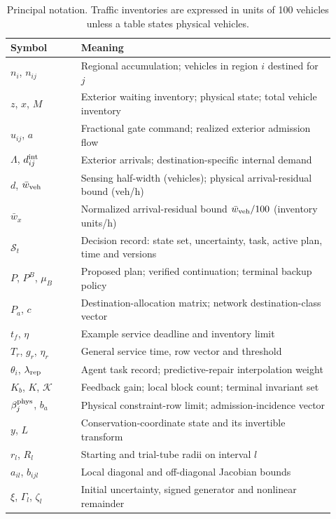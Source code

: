 \documentclass[preprint,12pt]{elsarticle}
\begin{document}
\begin{table}[!tp]
\centering\small
\caption{Principal notation. Traffic inventories are expressed in units of
100 vehicles unless a table states physical vehicles.}
\label{tab:nomenclature}
\renewcommand{\arraystretch}{0.98}
\begin{tabular}{@{}p{0.20\linewidth}p{0.72\linewidth}@{}}
\toprule
Symbol & Meaning\\
\midrule
$n_i$, $n_{ij}$ & Regional accumulation; vehicles in region $i$ destined for $j$\\
$z$, $x$, $M$ & Exterior waiting inventory; physical state; total vehicle inventory\\
$u_{ij}$, $a$ & Fractional gate command; realized exterior admission flow\\
$\Lambda$, $d^{\rm int}_{ij}$ & Exterior arrivals; destination-specific internal demand\\
$d$, $\bar w_{\rm veh}$ & Sensing half-width (vehicles); physical arrival-residual bound (veh/h)\\
$\bar w_x$ & Normalized arrival-residual bound $\bar w_{\rm veh}/100$ (inventory units/h)\\
$\mathcal S_t$ & Decision record: state set, uncertainty, task, active plan, time and versions\\
$P$, $P^B$, $\mu_B$ & Proposed plan; verified continuation; terminal backup policy\\
$P_a$, $c$ & Destination-allocation matrix; network destination-class vector\\
$t_f$, $\eta$ & Example service deadline and inventory limit\\
$T_r$, $g_r$, $\eta_r$ & General service time, row vector and threshold\\
$\theta_i$, $\lambda_{\rm rep}$ & Agent task record; predictive-repair interpolation weight\\
$K_b$, $K$, $\mathcal K$ & Feedback gain; local block count; terminal invariant set\\
$\beta_j^{\rm phys}$, $b_a$ & Physical constraint-row limit; admission-incidence vector\\
$y$, $L$ & Conservation-coordinate state and its invertible transform\\
$r_l$, $R_l$ & Starting and trial-tube radii on interval $l$\\
$a_{il}$, $b_{ijl}$ & Local diagonal and off-diagonal Jacobian bounds\\
$\xi$, $\Gamma_l$, $\zeta_l$ & Initial uncertainty, signed generator and nonlinear remainder\\

\end{tabular}
\end{table}
\end{document}
